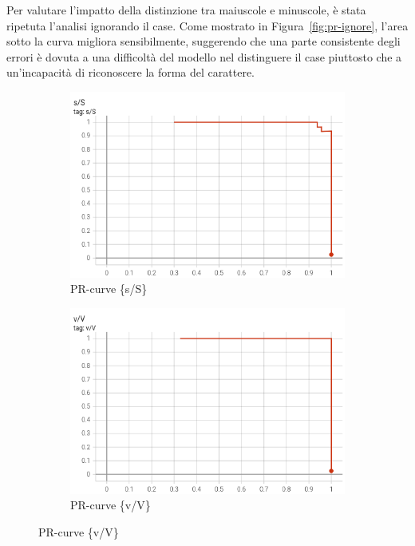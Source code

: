 Per valutare l'impatto della distinzione tra maiuscole e minuscole, è stata ripetuta l'analisi ignorando il case. Come mostrato in Figura~\ref{fig:pr-ignore}, l'area sotto la curva migliora sensibilmente, suggerendo che una parte consistente degli errori è dovuta a una difficoltà del modello nel distinguere il case piuttosto che a un'incapacità di riconoscere la forma del carattere.
\begin{figure}[htbp]
    \centering
    \begin{subfigure}[t]{0.30\textwidth}
        \centering
        \includegraphics[width=\textwidth]{images/pr_ignore1.png}
        \caption{PR-curve \{s/S\}}
    \end{subfigure}
    \begin{subfigure}[t]{0.30\textwidth}
        \centering
        \includegraphics[width=\textwidth]{images/pr_ignore2.png}
        \caption{PR-curve \{v/V\}}

\end{subfigure}
\end{figure}

